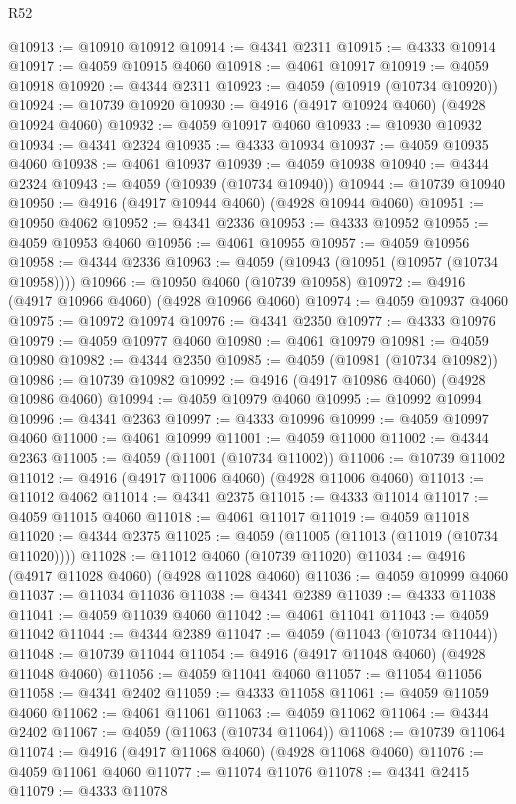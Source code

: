 \begin{lexlean}{R52}
\begin{coremodule}
@10913 := @10910 @10912
@10914 := @4341 @2311
@10915 := @4333 @10914
@10917 := @4059 @10915 @4060
@10918 := @4061 @10917
@10919 := @4059 @10918
@10920 := @4344 @2311
@10923 := @4059 (@10919 (@10734 @10920))
@10924 := @10739 @10920
@10930 := @4916 (@4917 @10924 @4060) (@4928 @10924 @4060)
@10932 := @4059 @10917 @4060
@10933 := @10930 @10932
@10934 := @4341 @2324
@10935 := @4333 @10934
@10937 := @4059 @10935 @4060
@10938 := @4061 @10937
@10939 := @4059 @10938
@10940 := @4344 @2324
@10943 := @4059 (@10939 (@10734 @10940))
@10944 := @10739 @10940
@10950 := @4916 (@4917 @10944 @4060) (@4928 @10944 @4060)
@10951 := @10950 @4062
@10952 := @4341 @2336
@10953 := @4333 @10952
@10955 := @4059 @10953 @4060
@10956 := @4061 @10955
@10957 := @4059 @10956
@10958 := @4344 @2336
@10963 := @4059 (@10943 (@10951 (@10957 (@10734 @10958))))
@10966 := @10950 @4060 (@10739 @10958)
@10972 := @4916 (@4917 @10966 @4060) (@4928 @10966 @4060)
@10974 := @4059 @10937 @4060
@10975 := @10972 @10974
@10976 := @4341 @2350
@10977 := @4333 @10976
@10979 := @4059 @10977 @4060
@10980 := @4061 @10979
@10981 := @4059 @10980
@10982 := @4344 @2350
@10985 := @4059 (@10981 (@10734 @10982))
@10986 := @10739 @10982
@10992 := @4916 (@4917 @10986 @4060) (@4928 @10986 @4060)
@10994 := @4059 @10979 @4060
@10995 := @10992 @10994
@10996 := @4341 @2363
@10997 := @4333 @10996
@10999 := @4059 @10997 @4060
@11000 := @4061 @10999
@11001 := @4059 @11000
@11002 := @4344 @2363
@11005 := @4059 (@11001 (@10734 @11002))
@11006 := @10739 @11002
@11012 := @4916 (@4917 @11006 @4060) (@4928 @11006 @4060)
@11013 := @11012 @4062
@11014 := @4341 @2375
@11015 := @4333 @11014
@11017 := @4059 @11015 @4060
@11018 := @4061 @11017
@11019 := @4059 @11018
@11020 := @4344 @2375
@11025 := @4059 (@11005 (@11013 (@11019 (@10734 @11020))))
@11028 := @11012 @4060 (@10739 @11020)
@11034 := @4916 (@4917 @11028 @4060) (@4928 @11028 @4060)
@11036 := @4059 @10999 @4060
@11037 := @11034 @11036
@11038 := @4341 @2389
@11039 := @4333 @11038
@11041 := @4059 @11039 @4060
@11042 := @4061 @11041
@11043 := @4059 @11042
@11044 := @4344 @2389
@11047 := @4059 (@11043 (@10734 @11044))
@11048 := @10739 @11044
@11054 := @4916 (@4917 @11048 @4060) (@4928 @11048 @4060)
@11056 := @4059 @11041 @4060
@11057 := @11054 @11056
@11058 := @4341 @2402
@11059 := @4333 @11058
@11061 := @4059 @11059 @4060
@11062 := @4061 @11061
@11063 := @4059 @11062
@11064 := @4344 @2402
@11067 := @4059 (@11063 (@10734 @11064))
@11068 := @10739 @11064
@11074 := @4916 (@4917 @11068 @4060) (@4928 @11068 @4060)
@11076 := @4059 @11061 @4060
@11077 := @11074 @11076
@11078 := @4341 @2415
@11079 := @4333 @11078

\end{coremodule}
\end{lexlean}
